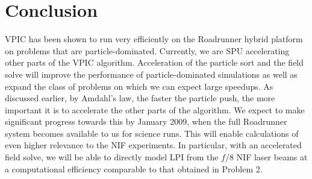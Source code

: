 \documentclass[journal,twoside]{IEEEtran}
\begin{document}
%

\section{Conclusion}

VPIC has been shown to run very efficiently on the Roadrunner hybrid
platform on problems that are particle-dominated.  Currently, we are
SPU accelerating other parts of the VPIC algorithm.  Acceleration of
the particle sort and the field solve will improve the performance of
particle-dominated simulations as well as expand the class of problems
on which we can expect large speedups.  As discussed earlier, by
Amdahl's law, the faster the particle push, the more important it is
to accelerate the other parts of the algorithm.  We expect to make
significant progress towards this by January 2009, when the full
Roadrunner system becomes available to us for science runs.
This will enable calculations of even higher relevance
to the NIF experiments. In particular, with an accelerated field
solve, we will be able to directly model LPI from the $f/8$ NIF laser
beams at a computational efficiency comparable to that obtained in 
Problem 2.
\end{document}
